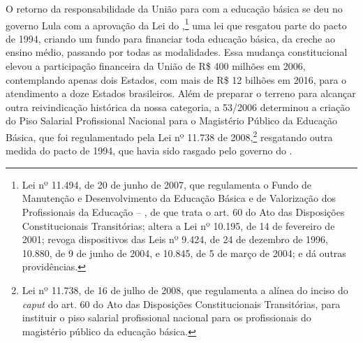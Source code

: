 O retorno da responsabilidade da União para com a educação básica se deu
no governo Lula com a aprovação da Lei do ,\footnote{Lei nº
  11.494, de 20 de junho de 2007, que regulamenta o Fundo de Manutenção e
  Desenvolvimento da Educação Básica e de Valorização dos Profissionais
  da Educação -- , de que trata o art. 60 do Ato das Disposições
  Constitucionais Transitórias; altera a Lei nº
  10.195, de 14 de fevereiro de 2001; revoga dispositivos das Leis
  nº 9.424, de 24 de dezembro de 1996, 10.880,
  de 9 de junho de 2004, e 10.845, de 5 de março de 2004; e dá outras
  providências.} uma lei que resgatou parte do pacto de 1994, criando
um fundo para financiar toda educação básica, da creche ao ensino médio,
passando por todas as modalidades. Essa mudança constitucional elevou a
participação financeira da União de R\$ 400 milhões em 2006,
contemplando apenas dois Estados, com mais de R\$ 12 bilhões em 2016,
para o atendimento a doze Estados brasileiros. Além de preparar o
terreno para alcançar outra reivindicação histórica da nossa categoria,
a  53/2006 determinou a criação do Piso Salarial Profissional Nacional
para o Magistério Público da Educação Básica, que foi regulamentado pela
Lei nº 11.738 de 2008,\footnote{Lei nº 11.738, de 16 de
  julho de 2008, que regulamenta a alínea  do inciso  do \emph{caput} do art.
  60 do Ato das Disposições Constitucionais Transitórias, para instituir
  o piso salarial profissional nacional para os profissionais do
  magistério público da educação
  básica.}
resgatando outra medida do pacto de 1994, que havia sido rasgado pelo
governo do .

